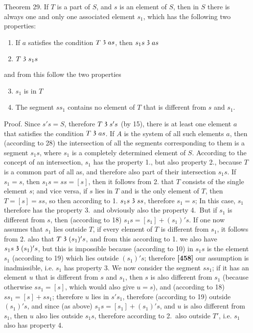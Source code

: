 \documentclass[leqno]{article}
\newcommand\partof{\mathrel{\raisebox{0.45ex}{$\mathfrak{3}$}}}
\begin{document}
Theorem 29. If $T$ is a part of $S$, and $s$ is an element of $S$, then in $S$ there is always one and only one associated element $s_1$, which has the following two properties:
\begin{enumerate}[1.]
	\item If $a$ satisfies the condition $T \partof as$, then $s_1s \partof as$
	\item $T \partof s_1s$
\end{enumerate}
and from this follow the two properties
\begin{enumerate}[1.]
	\setcounter{enumi}{2}
	\item $s_1$ is in $T$
	\item The segment $ss_1$ contains no element of $T$ that is different from $s$ and $s_1$.
\end{enumerate}
Proof. Since $s's = S$, therefore $T \partof s's$ (by 15), there is at least one element $a$ that satisfies the condition $T \partof as$. If $A$ is the system of all such elements $a$, then (according to 28) the intersection of all the segments corresponding to them is a segment $s_1s$, where $s_1$ is a completely determined element of $S$. 
According to the concept of an intersection, $s_1$ has the property 1., but also property 2., because $T$ is a common part of all as, and therefore also part of their intersection $s_1s$. If $s_1=s$, then $s_1s=ss=[s]$, then it follows from 2. that $T$ consists of the single element $s$; and vice versa, if $s$ lies in $T$ and is the only element of $T$, then $T = [s] = ss$, so then according to 1. $s_1s \partof ss$, therefore $s_1 = s$; In this case, $s_1$ therefore has the property 3.\ and obviously also the property 4.\ But if $s_1$ is different from $s$, then (according to 18) $s_1s= [s_1]+(s_1)'s$. 
If one now assumes that $s_1$ lies outside $T$, if every element of $T$ is different from $s_1$, it follows from 2. also that $T \partof (s_1)'s$, and from this according to 1. we also have $s_1s \partof (s_1)'s$, but this is impossible because (according to 10) in $s_1s$ is the element $s_1$ (according to 19) which lies outside $(s_1)'s$; therefore 
\textbf{[458]}
our assumption is inadmissible, i.e. $s_1$ has property 3. 
We now consider the segment $ss_1$; if it has an element $u$ that is different from $s$ and $s_1$, then $s$ is also different from $s_1$ (because otherwise $ss_1 = [s]$, which would also give $u=s$), and (according to 18) $ss_1 = [s] + ss_1$; therefore $u$ lies in $s's_1$, therefore (according to 19) outside $(s_1)'s$, and since (as above) $s_1s= [s_1] + (s_1)'s$, and $u$ is also different from $s_1$, then $u$ also lies outside $s_1s$, therefore according to 2.\ also outside $T'$, i.e. $s_1$ also has property 4.
\end{document}
